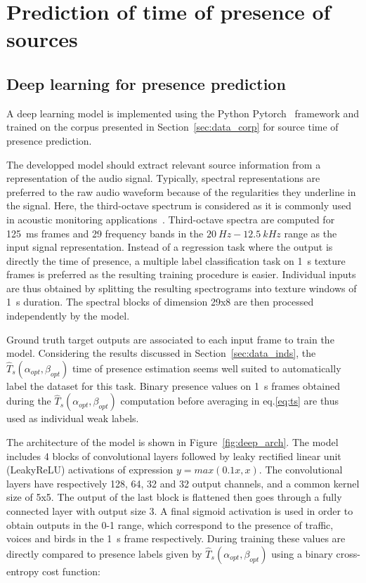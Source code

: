\documentclass[twocolumn]{article}
\begin{document}
\section{Prediction of time of presence of sources}
\label{sec:pred}

\subsection{Deep learning for presence prediction}
\label{sec:pred_deep}

A deep learning model is implemented using the Python Pytorch~\cite{paszke2017} framework and trained on the corpus presented in Section~\ref{sec:data_corp} for source time of presence prediction.

The developped model should extract relevant source information from a representation of the audio signal. Typically, spectral representations are preferred to the raw audio waveform because of the regularities they underline in the signal. Here, the third-octave spectrum is considered as it is commonly used in acoustic monitoring applications~\cite{ardouin2018, gontier2017}. Third-octave spectra are computed for 125~ms frames and 29 frequency bands in the $20~Hz - 12.5~kHz$ range as the input signal representation. Instead of a regression task where the output is directly the time of presence, a multiple label classification task on 1~s texture frames is preferred as the resulting training procedure is easier. Individual inputs are thus obtained by splitting the resulting spectrograms into texture windows of 1~s duration. The spectral blocks of dimension 29x8 are then processed independently by the model.

Ground truth target outputs are associated to each input frame to train the model. Considering the results discussed in Section~\ref{sec:data_inds}, the $\hat T_s(\alpha_{opt}, \beta_{opt})$ time of presence estimation seems well suited to automatically label the dataset for this task. Binary presence values on 1~s frames obtained during the $\hat T_s(\alpha_{opt}, \beta_{opt})$ computation before averaging in eq.\ref{eq:ts} are thus used as individual weak labels.

The architecture of the model is shown in Figure~\ref{fig:deep_arch}. The model includes 4 blocks of convolutional layers followed by leaky rectified linear unit (LeakyReLU) activations of expression $y = max(0.1x, x)$. The convolutional layers have respectively 128, 64, 32 and 32 output channels, and a common kernel size of 5x5. The output of the last block is flattened then goes through a fully connected layer with output size 3. A final sigmoid activation is used in order to obtain outputs in the 0-1 range, which correspond to the presence of traffic, voices and birds in the 1~s frame respectively. During training these values are directly compared to presence labels given by $\hat T_s(\alpha_{opt}, \beta_{opt})$ using a binary cross-entropy cost function:
\end{document}
